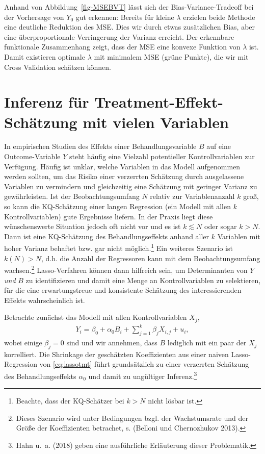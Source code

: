 \documentclass[
  a4paper,
  DIV=11,
  oneside]{scrreprt}
\begin{document}
Anhand von Abbildung~\ref{fig-MSEBVT} lässt sich der
Bias-Variance-Tradeoff bei der Vorhersage von \(Y_0\) gut erkennen:
Bereits für kleine \(\lambda\) erzielen beide Methode eine deutliche
Reduktion des MSE. Dies wir durch etwas zusätzlichen Bias, aber eine
überproportionale Verringerung der Varianz erreicht. Der erkennbare
funktionale Zusammenhang zeigt, dass der MSE eine konvexe Funktion von
\(\lambda\) ist. Damit existieren optimale \(\lambda\) mit minimalem MSE
(grüne Punkte), die wir mit Cross Validation schätzen können.

\section{Inferenz für Treatment-Effekt-Schätzung mit vielen
Variablen}\label{inferenz-fuxfcr-treatment-effekt-schuxe4tzung-mit-vielen-variablen}

In empirischen Studien des Effekts einer Behandlungsvariable \(B\) auf
eine Outcome-Variable \(Y\) steht häufig eine Vielzahl potentieller
Kontrollvariablen zur Verfügung. Häufig ist unklar, welche Variablen in
das Modell aufgenommen werden sollten, um das Risiko einer verzerrten
Schätzung durch ausgelassene Variablen zu vermindern und gleichzeitig
eine Schätzung mit geringer Varianz zu gewährleisten. Ist der
Beobachtungsumfang \(N\) relativ zur Variablenanzahl \(k\) groß, so kann
die KQ-Schätzung einer langen Regression (ein Modell mit allen \(k\)
Kontrollvariablen) gute Ergebnisse liefern. In der Praxis liegt diese
wünschenswerte Situation jedoch oft nicht vor und es ist \(k\lesssim N\)
oder sogar \(k>N\). Dann ist eine KQ-Schätzung des Behandlungseffekts
anhand aller \(k\) Variablen mit hoher Varianz behaftet bzw. gar nicht
möglich.\footnote{Beachte, dass der KQ-Schätzer bei \(k>N\) nicht lösbar
  ist.} Ein weiteres Szenario ist \(k(N)>N\), d.h. die Anzahl der
Regressoren kann mit dem Beobachtungsumfang wachsen.\footnote{Dieses
  Szenario wird unter Bedingungen bzgl. der Wachstumsrate und der Größe
  der Koeffizienten betrachet, s. (Belloni und Chernozhukov 2013).}
Lasso-Verfahren können dann hilfreich sein, um Determinanten von \(Y\)
\emph{und} \(B\) zu identifizieren und damit eine Menge an
Kontrollvariablen zu selektieren, für die eine erwartungstreue und
konsistente Schätzung des interessierenden Effekts wahrscheinlich ist.

Betrachte zunächst das Modell mit allen Kontrollvariablen \(X_j\),
\begin{align}
  Y_i = \beta_0 + \alpha_0 B_i + \sum_{j=1}^k \beta_{j} X_{i,j} + u_i, \label{eq:lassotmt}
\end{align} wobei einige \(\beta_{j}=0\) sind und wir annehmen, dass
\(B\) lediglich mit ein paar der \(X_j\) korrelliert. Die Shrinkage der
geschätzten Koeffizienten aus einer naiven Lasso-Regression von
\eqref{eq:lassotmt} führt grundsätzlich zu einer verzerrten Schätzung
des Behandlungseffekts \(\alpha_0\) und damit zu ungültiger
Inferenz.\footnote{Hahn u.~a. (2018) geben eine ausführliche Erläuterung
  dieser Problematik.}
\end{document}

